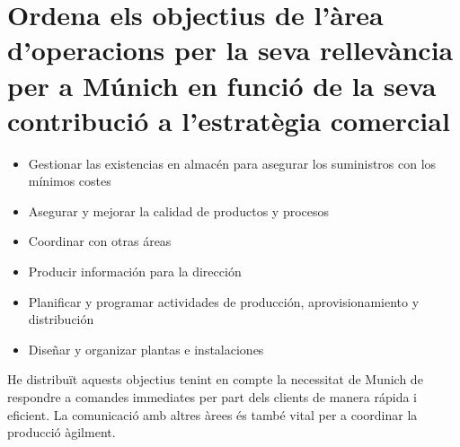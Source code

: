 \section{Ordena els objectius de l’àrea d’operacions per la seva rellevància 
per a Múnich en funció de la seva contribució a l’estratègia comercial}

\begin{itemize}
  \item Gestionar las existencias en almacén para asegurar los suministros
    con los mínimos costes
  \item Asegurar y mejorar la calidad de productos y procesos
  \item Coordinar con otras áreas
  \item Producir información para la dirección
  \item Planificar y programar actividades de producción, aprovisionamiento
    y distribución
  \item Diseñar y organizar plantas e instalaciones
\end{itemize}

He distribuït aquests objectius tenint en compte la necessitat de Munich de
respondre a comandes immediates per part dels clients de manera rápida i 
eficient. La comunicació amb altres àrees és també vital per a coordinar la
producció àgilment.
